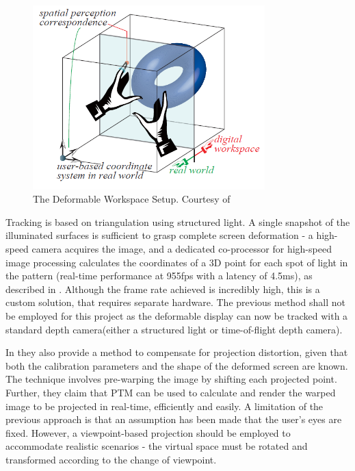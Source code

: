 \documentclass[]{article}
\begin{document}
\begin{figure}[hbtp]
    \centering
    \includegraphics[width=0.8\textwidth]{figures/TheDeformableWorkspace.PNG}
    \caption{The Deformable Workspace Setup. Courtesy of \cite{watanabe08}}
    \label{fig:deformable_workspace}
\end{figure}

Tracking is based on triangulation using structured light. A single snapshot of the illuminated surfaces is sufficient to grasp complete screen deformation - a high-speed camera acquires the image, and a dedicated co-processor for high-speed image processing calculates the coordinates of a 3D point for each spot of light in the pattern (real-time performance at 955fps with a latency of 4.5ms), as described in \cite{watanabe07}. Although the frame rate achieved is incredibly high, this is a custom solution, that requires separate hardware. The previous method shall not be employed for this project as the deformable display can now be tracked with a standard depth camera(either a structured light or time-of-flight depth camera).

In \cite{watanabe08} they also provide a method to compensate for projection distortion, given that both the calibration parameters and the shape of the deformed screen are known. The technique involves pre-warping the image by shifting each projected point. Further, they claim that PTM can be used to calculate and render the warped image to be projected in real-time, efficiently and easily. A limitation of the previous approach is that an assumption has been made that the user’s eyes are fixed. However, a viewpoint-based projection should be employed to accommodate realistic scenarios - the virtual space must be rotated and transformed according to the change of viewpoint.\\
\end{document}
